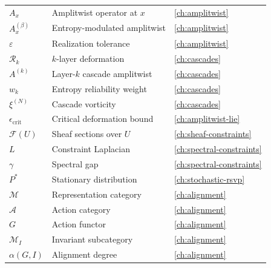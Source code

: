 \documentclass[12pt,a4paper,oneside]{book}
\numberwithin{equation}{chapter}
\theoremstyle{plain}
\theoremstyle{definition}
\theoremstyle{remark}
\begin{document}
\begin{center}
\begin{tabular}{lll}
$A_x$ & Amplitwist operator at $x$ & \cref{ch:amplitwist} \\
$A^{(\beta)}_x$ & Entropy-modulated amplitwist & \cref{ch:amplitwist} \\
$\varepsilon$ & Realization tolerance & \cref{ch:amplitwist} \\
$\mathcal{R}_k$ & $k$-layer deformation & \cref{ch:cascades} \\
$A^{(k)}$ & Layer-$k$ cascade amplitwist & \cref{ch:cascades} \\
$w_k$ & Entropy reliability weight & \cref{ch:cascades} \\
$\xi^{(N)}$ & Cascade vorticity & \cref{ch:cascades} \\
$\epsilon_\mathrm{crit}$ & Critical deformation bound & \cref{ch:amplitwist-lie} \\
$\mathcal{F}(U)$ & Sheaf sections over $U$ & \cref{ch:sheaf-constraints} \\
$L$ & Constraint Laplacian & \cref{ch:spectral-constraints} \\
$\gamma$ & Spectral gap & \cref{ch:spectral-constraints} \\
$P^\ast$ & Stationary distribution & \cref{ch:stochastic-rsvp} \\
$\mathcal{M}$ & Representation category & \cref{ch:alignment} \\
$\mathcal{A}$ & Action category & \cref{ch:alignment} \\
$G$ & Action functor & \cref{ch:alignment} \\
$\mathcal{M}_I$ & Invariant subcategory & \cref{ch:alignment} \\
$\alpha(G,I)$ & Alignment degree & \cref{ch:alignment} \\
\hline
\end{tabular}
\end{center}
\end{document}
